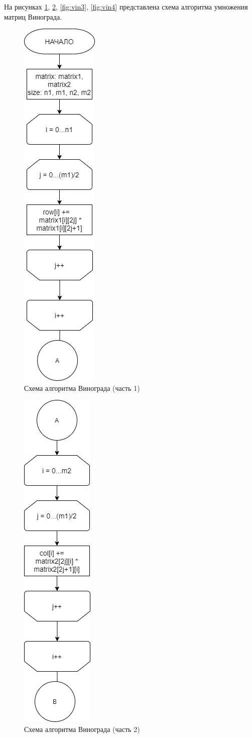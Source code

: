 \documentclass[12pt]{report}
\begin{document}
	\newpage
	
	На рисунках \ref{fig:vin1}, \ref{fig:vin2}, \ref{fig:vin3}, \ref{fig:vin4} представлена схема алгоритма умножения матриц Винограда.
	
	\begin{figure}[h]
		\centering
		\includegraphics[width=0.202\linewidth]{vin1.jpg}
		\caption{Схема алгоритма Винограда (часть 1)}
		\label{fig:vin1}
	\end{figure}
	
	\newpage
	
	\begin{figure}[h]
		\centering
		\includegraphics[width=0.207\linewidth]{vin2.jpg}
		\caption{Схема алгоритма Винограда (часть 2)}
		\label{fig:vin2}
	\end{figure}
	
\end{document}
